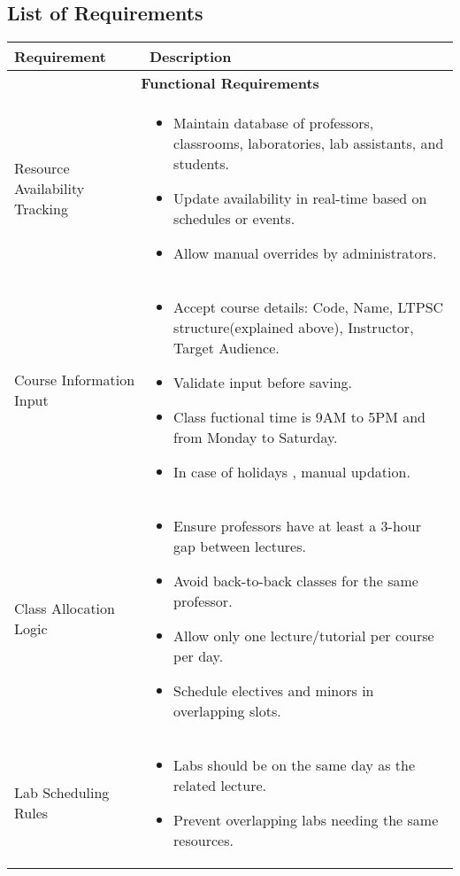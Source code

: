 \documentclass[12pt]{article}
\begin{document}
\subsection{List of Requirements}  
\begin{longtable}{|p{6cm}|p{8cm}|}
\hline
\textbf{Requirement} & \textbf{Description} \\
\hline

\multicolumn{2}{|c|}{\textbf{Functional Requirements}} \\
\hline

Resource Availability Tracking &
\begin{itemize}
    \item Maintain database of professors, classrooms, laboratories, lab assistants, and students.
    \item Update availability in real-time based on schedules or events.
    \item Allow manual overrides by administrators.
\end{itemize} \\
\hline

Course Information Input &
\begin{itemize}
    \item Accept course details: Code, Name, LTPSC structure(explained above), Instructor, Target Audience.
    \item Validate input before saving.
    \item Class fuctional time is 9AM to 5PM and from Monday to Saturday.
    \item In case of holidays , manual updation.
\end{itemize} \\
\hline

Class Allocation Logic &
\begin{itemize}
    \item Ensure professors have at least a 3-hour gap between lectures.
    \item Avoid back-to-back classes for the same professor.
    \item Allow only one lecture/tutorial per course per day.
    \item Schedule electives and minors in overlapping slots.
\end{itemize} \\
\hline

Lab Scheduling Rules &
\begin{itemize}
    \item Labs should be on the same day as the related lecture.
    \item Prevent overlapping labs needing the same resources.
\end{itemize} \\
\hline


\end{longtable}
\end{document}
